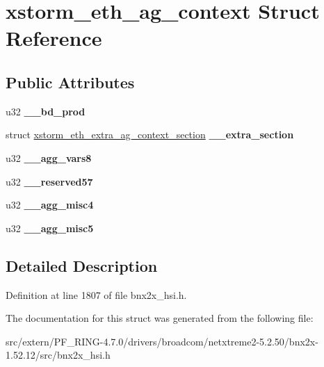 \hypertarget{structxstorm__eth__ag__context}{
\section{xstorm\_\-eth\_\-ag\_\-context Struct Reference}
\label{structxstorm__eth__ag__context}
}
\subsection*{Public Attributes}
\begin{DoxyCompactItemize}
\item 
\hypertarget{structxstorm__eth__ag__context_ac3ce1b521a32bbf2f43d5a1c2f6ede80}{
u32 {\bfseries \_\-\_\-bd\_\-prod}}
\label{structxstorm__eth__ag__context_ac3ce1b521a32bbf2f43d5a1c2f6ede80}

\item 
\hypertarget{structxstorm__eth__ag__context_aed6ca44e1cc9dd9d03093ac3235d7c32}{
struct \hyperlink{structxstorm__eth__extra__ag__context__section}{xstorm\_\-eth\_\-extra\_\-ag\_\-context\_\-section} {\bfseries \_\-\_\-extra\_\-section}}
\label{structxstorm__eth__ag__context_aed6ca44e1cc9dd9d03093ac3235d7c32}

\item 
\hypertarget{structxstorm__eth__ag__context_a582455176c1f95c7ced26163ccf52c35}{
u32 {\bfseries \_\-\_\-agg\_\-vars8}}
\label{structxstorm__eth__ag__context_a582455176c1f95c7ced26163ccf52c35}

\item 
\hypertarget{structxstorm__eth__ag__context_a85ce28cfc6b5a7fadf2cc36e65d20aae}{
u32 {\bfseries \_\-\_\-reserved57}}
\label{structxstorm__eth__ag__context_a85ce28cfc6b5a7fadf2cc36e65d20aae}

\item 
\hypertarget{structxstorm__eth__ag__context_a9b2ef066424fe574b1425c41262049c7}{
u32 {\bfseries \_\-\_\-agg\_\-misc4}}
\label{structxstorm__eth__ag__context_a9b2ef066424fe574b1425c41262049c7}

\item 
\hypertarget{structxstorm__eth__ag__context_a9d2032aa32a02d42b42922eff96e08a3}{
u32 {\bfseries \_\-\_\-agg\_\-misc5}}
\label{structxstorm__eth__ag__context_a9d2032aa32a02d42b42922eff96e08a3}

\end{DoxyCompactItemize}


\subsection{Detailed Description}


Definition at line 1807 of file bnx2x\_\-hsi.h.



The documentation for this struct was generated from the following file:\begin{DoxyCompactItemize}
\item 
src/extern/PF\_\-RING-\/4.7.0/drivers/broadcom/netxtreme2-\/5.2.50/bnx2x-\/1.52.12/src/bnx2x\_\-hsi.h\end{DoxyCompactItemize}
